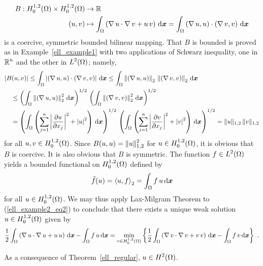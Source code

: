 \begin{egg}
\begin{align*}
B:H^{1,2}_0(\Omega) \times H^{1,2}_0(\Omega) &\rightarrow \mathbb{R} \\
(u,v) &\mapsto \int_\Omega \left( \operatorname{\nabla} u \cdot \operatorname{\nabla} v
+ u\, v \right) \,\mathrm{d}{{\bm{x}}}
= \int_\Omega \left( \operatorname{\nabla} u ,u \right)\cdot \left( \operatorname{\nabla} v, v \right)
\,\mathrm{d}{{\bm{x}}}
\end{align*}
is a coercive, symmetric bounded bilinear mapping.  That $B$ is bounded is
proved as in Example~\ref{ell_example1} with two applications of
Schwarz inequality, one in $\displaystyle \mathbb{R}^n$ and the other in
$\displaystyle L^2(\Omega)$;
namely,
\begin{align*}
&|B(u,v)| \leq \int_\Omega
\left| \left(\operatorname{\nabla} u, u\right) \cdot \left(\operatorname{\nabla} v, v\right) \right|
\,\mathrm{d}{{\bm{x}}}
\leq \int_\Omega \left\|\left(\operatorname{\nabla} u, u \right)\right\|_2\,
\left\| \left(\operatorname{\nabla} v, v\right)\right\|_2 \,\mathrm{d}{{\bm{x}}} \\
&\quad \leq \left( \int_\Omega \left\|
\left(\operatorname{\nabla} u, u\right)\right\|_2^2 \,\mathrm{d}{{\bm{x}}} \right)^{1/2} \,
\left( \int_\Omega \left\|\left(\operatorname{\nabla} v, v \right)\right\|_2^2
\,\mathrm{d}{{\bm{x}}}\right)^{1/2} \\
&\quad = \left( \int_\Omega \left( \sum_{j=1}^n
\left|\frac{\partial{u}}{\partial x_j}\right|^2+ \left|u\right|^2
\right) \,\mathrm{d}{{\bm{x}}} \right)^{1/2} \,
\left( \int_\Omega \left( \sum_{j=1}^n
\left|\frac{\partial{v}}{\partial x_j}\right|^2+ \left|v\right|^2
\right) \,\mathrm{d}{{\bm{x}}} \right)^{1/2}
= \| u\|_{1,2} \, \|v\|_{1,2}
\end{align*}
for all $\displaystyle u,v \in H^{1,2}_0(\Omega)$.
Since $\displaystyle B(u,u) = \|u\|_{1,2}^2$ for
$\displaystyle u\in H^{1,2}_0(\Omega)$, it is
obvious that $B$ is coercive.  It is also obvious that $B$ is
symmetric.  The function $\displaystyle f \in L^2(\Omega)$ yields a bounded
functional on $\displaystyle H^{1,2}_0(\Omega)$ defined by
\[
\tilde{f}(u) = \left\langle{u} , {f}\right\rangle_2 = \int_\Omega f\,u \,\mathrm{d}{{\bm{x}}}
\]
for all $\displaystyle u \in H^{1,2}_0(\Omega)$.
We may thus apply Lax-Milgram Theorem to (\ref{ell_example2_eq2}) to
conclude that there exists a unique weak solution 
$\displaystyle u \in H^{1,2}_0(\Omega)$ given by
\[
\frac{1}{2} \int_\Omega \left( \operatorname{\nabla} u \cdot \operatorname{\nabla} u 
+u\, u \right) \,\mathrm{d}{{\bm{x}}} -\int_\Omega f\, u \,\mathrm{d}{{\bm{x}}}
= \min_{v\in H^{1,2}_0(\Omega)} \left\{ \frac{1}{2}
\int_\Omega \left( \operatorname{\nabla} v \cdot \operatorname{\nabla} v +v\, v \right) \,\mathrm{d}{{\bm{x}}}
-\int_\Omega f\, v \,\mathrm{d}{{\bm{x}}} \right\} \ .
\]

As a consequence of Theorem~\ref{ell_regular}, $\displaystyle u\in H^2(\Omega)$.


\end{egg}
